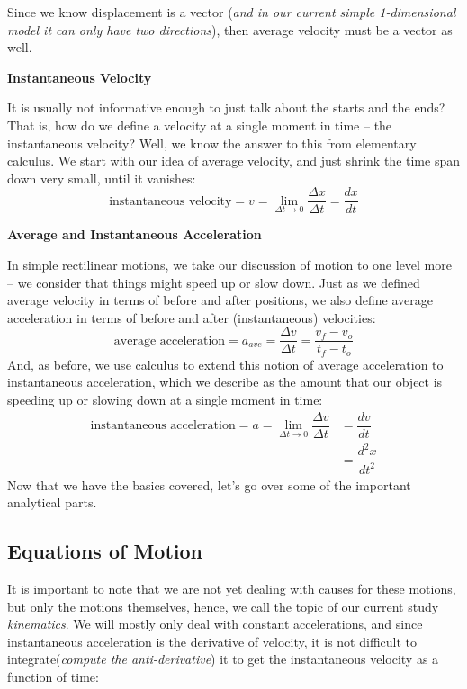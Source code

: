 \documentclass[12pt,addpoints]{exam}
\begin{document}
	Since we know displacement is a vector (\textit{and in our current simple 1-dimensional model it can only have two directions}), then average velocity must be a vector as well.
	\begin{center}
		\textbf{Instantaneous Velocity}
	\end{center}
	It is usually not informative enough to just talk about the starts and the ends? That is, how do we define a velocity at a single moment in time – the instantaneous velocity? Well, we know the answer to this from elementary calculus. We start with our idea of average velocity, and just shrink the time span down very small, until it vanishes:
	$$\text{instantaneous velocity} = v = \lim_{\Delta t \rightarrow 0} \dfrac{\Delta x}{\Delta t} = \dfrac{dx}{dt}$$
	\begin{center}
		\textbf{Average and Instantaneous Acceleration}
	\end{center}
	In simple rectilinear motions, we take our discussion of motion to one level more – we consider that things might speed up or slow down. Just as we defined average velocity in terms of before and after positions, we also define average acceleration in terms of before and after (instantaneous) velocities:
	$$\text{average acceleration} = a_{ave} = \dfrac{\Delta v}{\Delta t} = \dfrac{v_f-v_o}{t_f-t_o}$$
	And, as before, we use calculus to extend this notion of average acceleration to instantaneous acceleration, which we describe as the amount that our object is speeding up or slowing down at a single moment in time:
	\begin{align} \text{instantaneous acceleration} = a = \lim_{\Delta t \rightarrow 0} \dfrac{\Delta v}{\Delta t} &= \dfrac{dv}{dt} \\[5pt] &= \dfrac{d^2x}{dt^2}\end{align}
	Now that we have the basics covered, let's go over some of the important analytical parts.
	\begin{center}
		\subsection*{Equations of Motion}
	\end{center}
	It is important to note that we are not yet dealing with causes for these motions, but only the motions themselves, hence, we call the topic of our current study \textit{kinematics}. We will mostly only deal with constant accelerations, and since instantaneous acceleration is the derivative of velocity, it is not difficult to integrate(\textit{compute the anti-derivative}) it to get the instantaneous velocity as a function of time:
\end{document}
